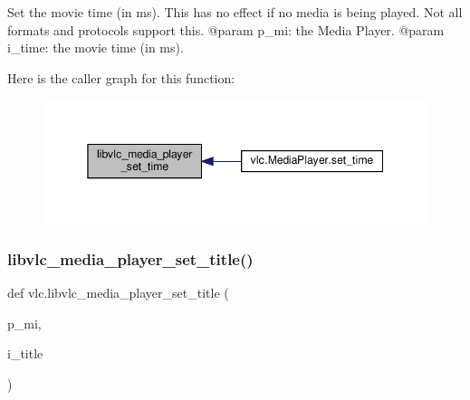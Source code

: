 \begin{DoxyVerb}Set the movie time (in ms). This has no effect if no media is being played.
Not all formats and protocols support this.
@param p_mi: the Media Player.
@param i_time: the movie time (in ms).
\end{DoxyVerb}
 Here is the caller graph for this function\+:
\nopagebreak
\begin{figure}[H]
\begin{center}
\leavevmode
\includegraphics[width=345pt]{namespacevlc_a5c3c0d97463b2f97e3d68d1a2a8934dd_icgraph}
\end{center}
\end{figure}
\mbox{\label{namespacevlc_a046141b3f0caa945606a55fd49c07a7f}} 
\subsubsection{\texorpdfstring{libvlc\+\_\+media\+\_\+player\+\_\+set\+\_\+title()}{libvlc\_media\_player\_set\_title()}}
{\footnotesize\ttfamily def vlc.\+libvlc\+\_\+media\+\_\+player\+\_\+set\+\_\+title (\begin{DoxyParamCaption}\item[{}]{p\+\_\+mi,  }\item[{}]{i\+\_\+title }\end{DoxyParamCaption})}

